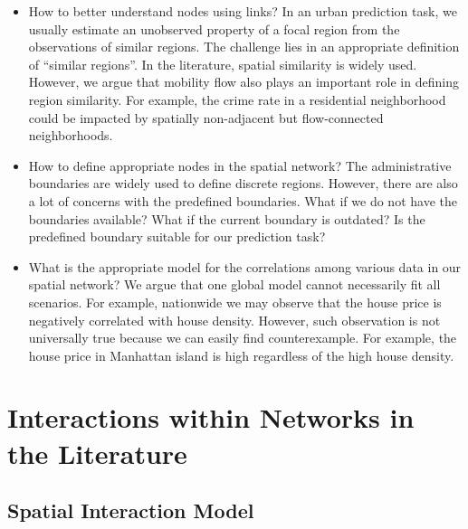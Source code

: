 \begin{itemize}
\item How to better understand nodes using links? In an urban prediction task, we usually estimate an unobserved property of a focal region from the observations of similar regions. The challenge lies in an appropriate definition of ``similar regions''. In the literature, spatial similarity is widely used. However, we argue that mobility flow also plays an important role in defining region similarity. For example, the crime rate in a residential neighborhood could be impacted by spatially non-adjacent but flow-connected neighborhoods.
\item How to define appropriate nodes in the spatial network? The administrative boundaries are widely used to define discrete regions. However, there are also a lot of concerns with the predefined boundaries. What if we do not have the boundaries available? What if the current boundary is outdated? Is the predefined boundary suitable for our prediction task?
\item What is the appropriate model for the correlations among various data in our spatial network? We argue that one global model cannot necessarily fit all scenarios. For example, nationwide we may observe that the house price is negatively correlated with house density. However, such observation is not universally true because we can easily find counterexample. For example, the house price in Manhattan island is high regardless of the high house density.
\end{itemize}




\section{Interactions within Networks in the Literature}
\label{sec:ew}



\subsection{Spatial Interaction Model}


